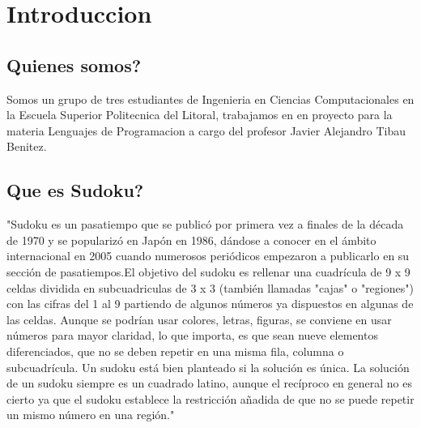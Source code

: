 \documentclass[11pt,fleqn]{book} %
\begin{document}


\pagestyle{empty} %

\tableofcontents %

\cleardoublepage %

\pagestyle{fancy} %



\chapter{Introduccion}

\section{Quienes somos?}

Somos un grupo de tres estudiantes de Ingenieria en Ciencias Computacionales en la Escuela Superior Politecnica del Litoral, trabajamos en en proyecto para la materia Lenguajes de Programacion a cargo del profesor Javier Alejandro Tibau Benitez.



\section{Que es Sudoku?}

"Sudoku es un pasatiempo que se publicó por primera vez a finales de la década de 1970 y se popularizó en Japón en 1986, dándose a conocer en el ámbito internacional en 2005 cuando numerosos periódicos empezaron a publicarlo en su sección de pasatiempos.El objetivo del sudoku es rellenar una cuadrícula de 9 x 9 celdas dividida en subcuadriculas de 3 x 3 (también llamadas "cajas" o "regiones") con las cifras del 1 al 9 partiendo de algunos números ya dispuestos en algunas de las celdas.  Aunque se podrían usar colores, letras, figuras, se conviene en usar números para mayor claridad, lo que importa, es que sean nueve elementos diferenciados, que no se deben repetir en una misma fila, columna o subcuadrícula. Un sudoku está bien planteado si la solución es única. La solución de un sudoku siempre es un cuadrado latino, aunque el recíproco en general no es cierto ya que el sudoku establece la restricción añadida de que no se puede repetir un mismo número en una región." \cite{http://es.wikipedia.org/wiki/Sudoku}
\end{document}

